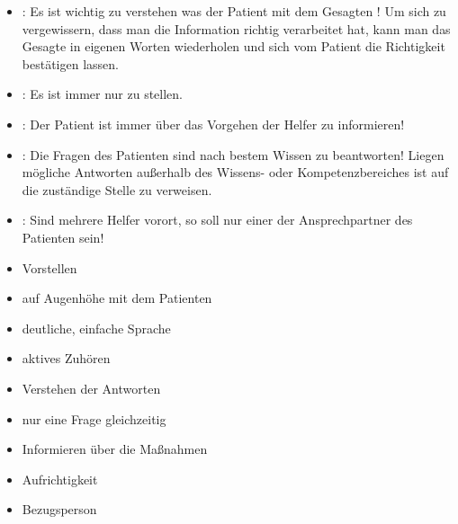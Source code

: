 \documentclass[
ngerman,
paper=a4,
asymmetric,
fontsize=10pt,
draft=false,
numbers=noenddot,
bibtotocnumbered,
footnotes=multiple,
]{scrreprt}
\begin{document}
{\begin{itemize}
    Negativbeispiel: \begin{quote}\end{quote}
    \item {}: Es ist wichtig zu verstehen was der
    Patient mit dem Gesagten ! Um sich zu vergewissern, dass man die
    Information richtig verarbeitet hat, kann man das Gesagte in
    eigenen Worten wiederholen und sich vom Patient die Richtigkeit bestätigen
    lassen.
    \item {}: Es ist immer nur  zu stellen.
    \item {}: Der Patient ist immer über das Vorgehen der Helfer
    zu informieren!
    \item {}: Die Fragen des
    Patienten sind nach bestem Wissen zu beantworten!  Liegen mögliche Antworten außerhalb des Wissens-
    oder Kompetenzbereiches ist auf die zuständige Stelle zu verweisen.
    \item {}: Sind mehrere Helfer
    vorort, so soll nur einer der Ansprechpartner des
    Patienten sein!\label{topic:einer-redet}
\end{itemize}
}{
\begin{itemize}
  \item Vorstellen
  \item auf Augenhöhe mit dem Patienten
  \item deutliche, einfache Sprache
  \item aktives Zuhören
  \item Verstehen der Antworten
  \item nur eine Frage gleichzeitig
  \item Informieren über die Maßnahmen
  \item Aufrichtigkeit
  \item Bezugsperson
\end{itemize}
}{}{}{}
\end{document}
